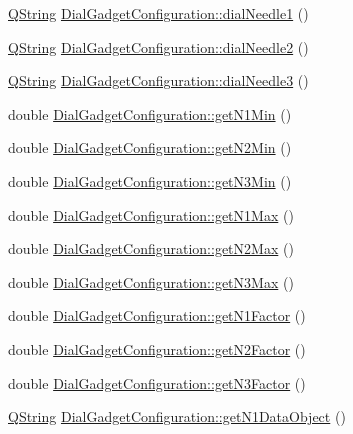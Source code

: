 \begin{DoxyCompactItemize}
\item 
\hyperlink{group___u_a_v_objects_plugin_gab9d252f49c333c94a72f97ce3105a32d}{\-Q\-String} \hyperlink{group___dial_plugin_ga30ac2e08e3864b71a35da761cfdcfc5e}{\-Dial\-Gadget\-Configuration\-::dial\-Needle1} ()
\item 
\hyperlink{group___u_a_v_objects_plugin_gab9d252f49c333c94a72f97ce3105a32d}{\-Q\-String} \hyperlink{group___dial_plugin_ga08a35848cfbe48ecdb7c63f3a3f461b8}{\-Dial\-Gadget\-Configuration\-::dial\-Needle2} ()
\item 
\hyperlink{group___u_a_v_objects_plugin_gab9d252f49c333c94a72f97ce3105a32d}{\-Q\-String} \hyperlink{group___dial_plugin_gacca23f23b817f81e3956ef1bb758dcd7}{\-Dial\-Gadget\-Configuration\-::dial\-Needle3} ()
\item 
double \hyperlink{group___dial_plugin_ga09c2b5e2f5c5666cb9f0a0fde52dbb8f}{\-Dial\-Gadget\-Configuration\-::get\-N1\-Min} ()
\item 
double \hyperlink{group___dial_plugin_ga0d4493d4a59c40439e7d22de908b5f81}{\-Dial\-Gadget\-Configuration\-::get\-N2\-Min} ()
\item 
double \hyperlink{group___dial_plugin_ga4006135115987335ad060540e13b84c6}{\-Dial\-Gadget\-Configuration\-::get\-N3\-Min} ()
\item 
double \hyperlink{group___dial_plugin_ga8a4ca5378ff9f7cbbbaa8606d12969b9}{\-Dial\-Gadget\-Configuration\-::get\-N1\-Max} ()
\item 
double \hyperlink{group___dial_plugin_ga555504dee11630dd0129fbac45ede1b7}{\-Dial\-Gadget\-Configuration\-::get\-N2\-Max} ()
\item 
double \hyperlink{group___dial_plugin_ga3f7e435241bf176b23d3fa49ca1c18ee}{\-Dial\-Gadget\-Configuration\-::get\-N3\-Max} ()
\item 
double \hyperlink{group___dial_plugin_ga760d22b7741ef7b0a7796ccf47779137}{\-Dial\-Gadget\-Configuration\-::get\-N1\-Factor} ()
\item 
double \hyperlink{group___dial_plugin_ga89ad791b4b244008b6dfde880dd325bf}{\-Dial\-Gadget\-Configuration\-::get\-N2\-Factor} ()
\item 
double \hyperlink{group___dial_plugin_gad5c42344ef84fcb60ca310ba8480a141}{\-Dial\-Gadget\-Configuration\-::get\-N3\-Factor} ()
\item 
\hyperlink{group___u_a_v_objects_plugin_gab9d252f49c333c94a72f97ce3105a32d}{\-Q\-String} \hyperlink{group___dial_plugin_ga47479787c12078cbe5a51eed6ce29254}{\-Dial\-Gadget\-Configuration\-::get\-N1\-Data\-Object} ()
\item 

\end{DoxyCompactItemize}
